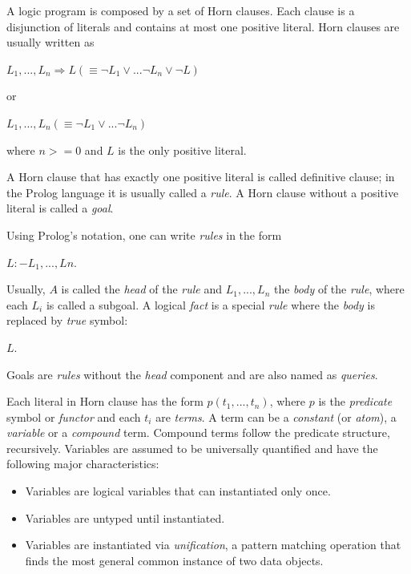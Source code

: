 A logic program is composed by a set of Horn clauses. Each clause is a disjunction of literals
and contains at most one positive literal. Horn clauses are usually written as

\begin{center}
  $L_{1}, ..., L_{n} \Longrightarrow L  (\equiv \neg L_{1} \vee ... \neg L_{n} \vee \neg L)$
\end{center}

or

\begin{center}
  $L_{1}, ..., L_{n}  (\equiv \neg L_{1} \vee ... \neg L_{n})$
\end{center}

where $n >= 0$ and $L$ is the only positive literal. 

A Horn clause that has exactly one positive literal is called definitive clause; in the Prolog language
it is usually called a \textit{rule}.
A Horn clause without a positive literal is called a \textit{goal}.

Using Prolog's notation, one can write \textit{rules} in the form

\begin{center}
  $L :- L_{1}, ..., L{n}.$
\end{center}

Usually, $A$ is called the \textit{head} of the \textit{rule} and $L_{1}, ..., L_{n}$
the \textit{body} of the \textit{rule}, where each $L_{i}$ is called a subgoal.
A logical \textit{fact} is a special \textit{rule} where the \textit{body} is replaced by \textit{true} symbol:

\begin{center}
  $L.$
\end{center}

Goals are \textit{rules} without the \textit{head} component and are also named as \textit{queries}.


Each literal in Horn clause has the form $p(t_{1}, ..., t_{n})$, where $p$ is the \textit{predicate} symbol or \textit{functor}
and each $t_{i}$ are \textit{terms}. A term can be a \textit{constant} (or \textit{atom}), a \textit{variable}
or a \textit{compound} term. Compound terms follow the predicate structure, recursively.
Variables are assumed to be universally quantified and have the following major characteristics:

\begin{itemize}
  \item Variables are logical variables that can instantiated only once.
  \item Variables are untyped until instantiated.
  \item Variables are instantiated via \textit{unification}, a pattern matching operation that finds the most general common instance of two data objects. 
\end{itemize}


